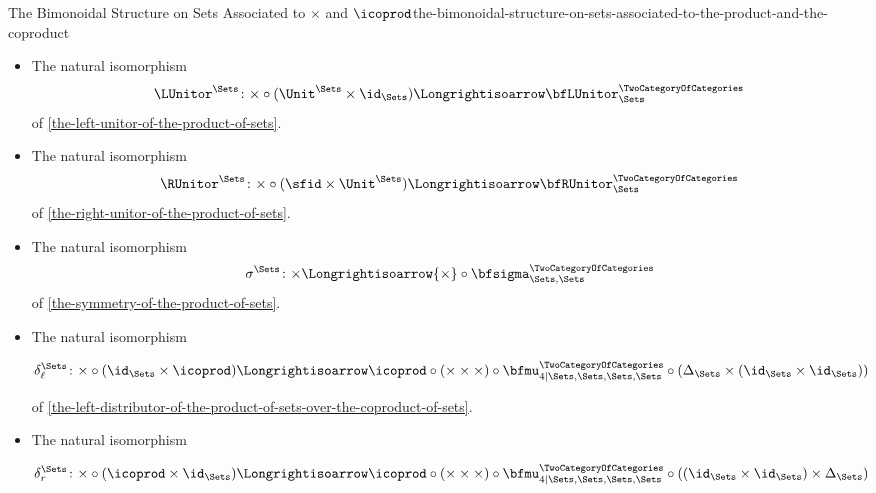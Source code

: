 \begin{proposition}{The Bimonoidal Structure on Sets Associated to $\times$ and $\icoprod$}{the-bimonoidal-structure-on-sets-associated-to-the-product-and-the-coproduct}
\begin{itemize}
\[            \]
            of \cref{the-associator-of-the-product-of-sets}.
        \item{}The natural isomorphism
            \[
                \LUnitor^{\Sets}%
                \colon%
                {\times}\circ{(\Unit^{\Sets}\times\id_{\Sets})}
                \Longrightisoarrow
                \bfLUnitor^{\TwoCategoryOfCategories}_{\Sets}
            \]
            of \cref{the-left-unitor-of-the-product-of-sets}.
        \item{}The natural isomorphism
            \[
                \RUnitor^{\Sets}%
                \colon%
                {\times}\circ{({\sfid}\times{\Unit^{\Sets}})}%
                \Longrightisoarrow%
                \bfRUnitor^{\TwoCategoryOfCategories}_{\Sets}%
            \]
            of \cref{the-right-unitor-of-the-product-of-sets}.
        \item{}The natural isomorphism
            \[
                \sigma^{\Sets}
                \colon
                {\times}
                \Longrightisoarrow
                {\times}\circ{\bfsigma^{\TwoCategoryOfCategories}_{\Sets,\Sets}}
            \]
            of \cref{the-symmetry-of-the-product-of-sets}.
        \item{}The natural isomorphism
            \begin{envfootnotesize}
                \[
                    \delta^{\Sets}_{\ell}
                    \colon
                    \mathord{\times}\circ(\id_{\Sets}\times\mathord{\icoprod})
                    \Longrightisoarrow
                    \mathord{\icoprod}\circ(\mathord{\times}\times\mathord{\times})\circ\bfmu^{\TwoCategoryOfCategories}_{4|\Sets,\Sets,\Sets,\Sets}\circ(\Delta_{\Sets}\times(\id_{\Sets}\times\id_{\Sets}))
                \]%
            \end{envfootnotesize}
            of \cref{the-left-distributor-of-the-product-of-sets-over-the-coproduct-of-sets}.
        \item{}The natural isomorphism
            \begin{envfootnotesize}
            \[
                \delta^{\Sets}_{r}
                \colon
                \mathord{\times}\circ(\mathord{\icoprod}\times\id_{\Sets})
                \Longrightisoarrow
                \mathord{\icoprod}\circ(\mathord{\times}\times\mathord{\times})\circ\bfmu^{\TwoCategoryOfCategories}_{4|\Sets,\Sets,\Sets,\Sets}\circ((\id_{\Sets}\times\id_{\Sets})\times\Delta_{\Sets})
\]
\end{envfootnotesize}
\end{itemize}
\end{proposition}
